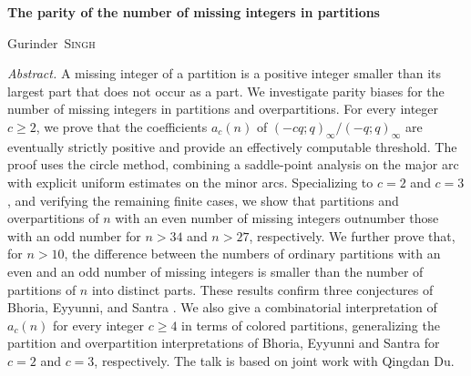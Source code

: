 \documentclass[a4paper,10pt]{amsart}
\begin{document}
                                
	
		
\thispagestyle{empty}    
	
	
\begin{center}
	\textbf{\Large{The parity of the number of missing integers in partitions}}
\end{center}


\vskip 0.2cm
	
	

\begin{center}
	Gurinder~\textsc{Singh} %
\end{center}

\vskip 0.8cm
	
	
	

\textit{Abstract.} A missing integer of a partition is a positive integer smaller than its largest part that does not occur as a part. We investigate parity biases for the number of missing integers in partitions and overpartitions. For every integer $c\ge2$, we prove that the coefficients $a_c(n)$ of $(-cq;q)_\infty/(-q;q)_\infty$ are eventually strictly positive and provide an effectively computable threshold. The proof uses the circle method, combining a saddle-point analysis on the major arc with explicit uniform estimates on the minor arcs. Specializing to $c=2$ and $c=3$, and verifying the remaining finite cases, we show that partitions and overpartitions of $n$ with an even number of missing integers outnumber those with an odd number for $n>34$ and $n>27$, respectively. We further prove that, for $n>10$, the difference between the numbers of ordinary partitions with an even and an odd number of missing integers is smaller than the number of partitions of $n$ into distinct parts. These results confirm three conjectures of Bhoria, Eyyunni, and Santra \cite{BES_2026}. We also give a combinatorial interpretation of $a_c(n)$ for every integer $c\ge4$ in terms of colored partitions, generalizing the partition and overpartition interpretations of Bhoria, Eyyunni and Santra for $c=2$ and $c=3$, respectively. The talk is based on joint work with Qingdan Du.
\end{document}
